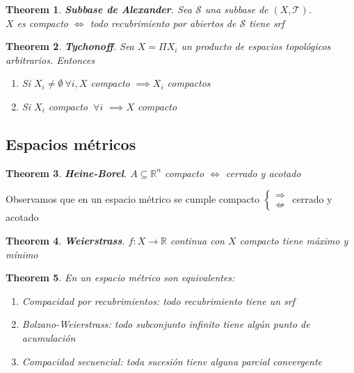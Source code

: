 \documentclass[leqno]{article}
\newtheorem*{theorem}{Theorem}
\begin{document}
\begin{theorem}
\textbf{Subbase de Alexander}. Sea $\mathcal{S}$ una subbase de $(X, \mathcal{T})$. \\
$X$ es compacto $\iff$ todo recubrimiento por abiertos de $\mathcal{S}$ tiene srf
\end{theorem}

\begin{theorem} \textbf{Tychonoff}. 
Sea $X=\Pi X_i$ un producto de espacios topológicos arbitrarios. Entonces
\begin{enumerate}[topsep=-6pt, itemsep=0pt]
  \item Si $X_i \neq \emptyset \ \forall i, X$ compacto $\implies X_i$ compactos
  \item Si $X_i$ compacto $\ \forall i$ $\implies X$ compacto
\end{enumerate}
\end{theorem}


\subsection{Espacios métricos}
\begin{theorem}
\textbf{Heine-Borel}. $A\subseteq \mathbb{R}^n$ compacto $\iff$ cerrado y acotado
\end{theorem}
Observamos que en un espacio métrico se cumple compacto $\begin{cases}
  \Rightarrow \\ \not\Leftarrow 
\end{cases}$ cerrado y acotado

\begin{theorem}
\textbf{Weierstrass}. $f:X \to \mathbb{R}$ continua con $X$ compacto tiene máximo y mínimo
\end{theorem}

\begin{theorem}
  En un espacio métrico son equivalentes:
  \begin{enumerate}[topsep=-6pt, itemsep=0pt]
    \item \textit{Compacidad por recubrimientos}: todo recubrimiento tiene un srf 
	\item \textit{Bolzano-Weierstrass}: todo subconjunto infinito tiene algún punto de acumulación
	\item \textit{Compacidad secuencial}: toda sucesión tiene alguna parcial convergente
  \end{enumerate}
\end{theorem}
\end{document}
